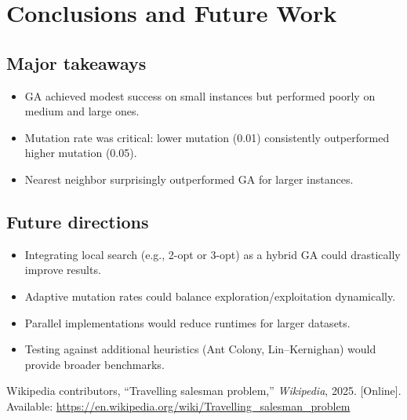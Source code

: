 \documentclass[conference]{IEEEtran}
\begin{document}
\section{Conclusions and Future Work}
\subsection{Major takeaways}
\begin{itemize}
    \item GA achieved modest success on small instances but performed poorly on medium and large ones.
    \item Mutation rate was critical: lower mutation (0.01) consistently outperformed higher mutation (0.05).
    \item Nearest neighbor surprisingly outperformed GA for larger instances.
\end{itemize}

\subsection{Future directions}
\begin{itemize}
    \item Integrating local search (e.g., 2-opt or 3-opt) as a hybrid GA could drastically improve results.
    \item Adaptive mutation rates could balance exploration/exploitation dynamically.
    \item Parallel implementations would reduce runtimes for larger datasets.
    \item Testing against additional heuristics (Ant Colony, Lin–Kernighan) would provide broader benchmarks.
\end{itemize}



\begin{thebibliography}{1}
 Wikipedia contributors, ``Travelling salesman problem,'' \emph{Wikipedia}, 2025. [Online]. Available: \url{https://en.wikipedia.org/wiki/Travelling_salesman_problem}
\end{thebibliography}
\end{document}
